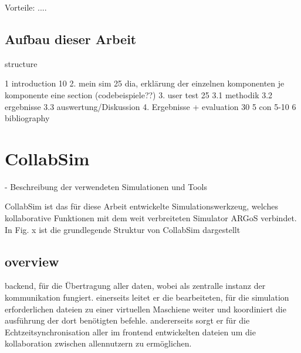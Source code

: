 \documentclass[german,version-2020-11]{uzl-thesis}
\begin{document}
    Vorteile: ....


\section{Aufbau dieser Arbeit}


%

structure 

1 introduction 10%
2. mein sim 25%
dia, erklärung der einzelnen komponenten je komponente eine section (codebeispiele??)
3. user test 25%
3.1 methodik 3.2 ergebnisse 3.3 auswertung/Diskussion
4. Ergebnisse + evaluation 30%
5 con 5-10%
6 bibliography






%

\chapter{CollabSim}%
\label{chapter-use}
- Beschreibung der verwendeten Simulationen und Tools

CollabSim ist das für diese Arbeit entwickelte Simulationswerkzeug, welches kollaborative Funktionen mit dem weit verbreiteten Simulator ARGoS verbindet. 
In Fig. x ist die grundlegende Struktur von CollabSim dargestellt


\section{overview}
backend, für die Übertragung aller daten, wobei als zentralle instanz der kommunikation fungiert. 
einerseits leitet er die bearbeiteten, für die simulation erforderlichen dateien zu einer virtuellen Maschiene weiter und koordiniert die ausführung der dort benötigten befehle. 
andererseits sorgt er für die Echtzeitsynchronisation aller im frontend entwickelten dateien um die kollaboration zwischen allennutzern zu ermöglichen.
\end{document}
